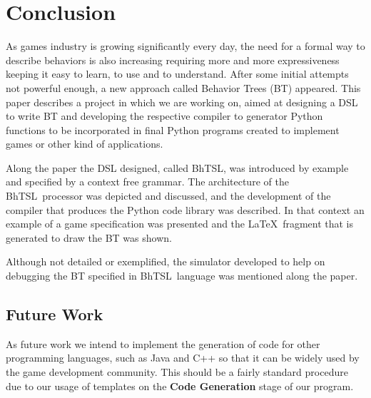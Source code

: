 \documentclass[a4paper,UKenglish,cleveref, autoref, thm-restate]{oasics-v2019}
\def\bht{BhTSL}
\begin{document}
\section{Conclusion}
\label{sec:conclusion}

As games industry is growing significantly every day, the need for a formal way to describe behaviors  
is also increasing requiring more and more expressiveness keeping it easy to learn, to use and to understand.
After some initial attempts not powerful enough, a new approach called Behavior Trees (BT) appeared.
This paper describes a project in which we are working on, aimed at designing a DSL to write BT
and developing the respective compiler to generator Python functions to be incorporated in final Python
programs created to implement games or other kind of applications.

Along the paper the DSL designed, called \bht, was introduced by example and specified by a context 
free grammar. 
The architecture of the \bht\ processor was depicted and discussed, and the development of the compiler that produces the
Python code library  was described.
In that context an example of a game  specification was presented and the \LaTeX\ fragment that is
 generated to draw the BT was shown.
 
Although not detailed or exemplified, the simulator developed to help on debugging the BT specified in
\bht\ language was mentioned along the paper. 

\subsection{Future Work}
As future work we intend to implement the generation of code for other programming languages, such as Java and C++ so that it can be widely used by the game development community.
This should be a fairly standard procedure due to our usage of templates on the \textbf{Code Generation} stage of our program.



\end{document}
